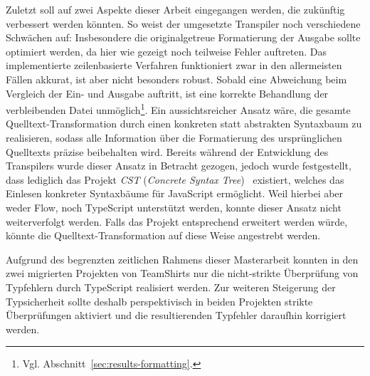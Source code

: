 Zuletzt soll auf zwei Aspekte dieser Arbeit eingegangen werden, die zukünftig verbessert werden könnten. So weist der umgesetzte Transpiler noch verschiedene Schwächen auf: Insbesondere die originalgetreue Formatierung der Ausgabe sollte optimiert werden, da hier wie gezeigt noch teilweise Fehler auftreten. Das implementierte zeilenbasierte Verfahren funktioniert zwar in den allermeisten Fällen akkurat, ist aber nicht besonders robust. Sobald eine Abweichung beim Vergleich der Ein- und Ausgabe auftritt, ist eine korrekte Behandlung der verbleibenden Datei unmöglich\footnote{Vgl. Abschnitt~\ref{sec:results-formatting}.}. Ein aussichtsreicher Ansatz wäre, die gesamte Quelltext-Transformation durch einen konkreten statt abstrakten Syntaxbaum zu realisieren, sodass alle Information über die Formatierung des ursprünglichen Quelltexts präzise beibehalten wird. Bereits während der Entwicklung des Transpilers wurde dieser Ansatz in Betracht gezogen, jedoch wurde festgestellt, dass lediglich das Projekt \textit{CST} (\textit{Concrete Syntax Tree})~\autocite{SOFTWARE:CST} existiert, welches das Einlesen konkreter Syntaxbäume für JavaScript ermöglicht. Weil hierbei aber weder Flow, noch TypeScript unterstützt werden, konnte dieser Ansatz nicht weiterverfolgt werden. Falls das Projekt entsprechend erweitert werden würde, könnte die Quelltext-Transformation auf diese Weise angestrebt werden.

Aufgrund des begrenzten zeitlichen Rahmens dieser Masterarbeit konnten in den zwei migrierten Projekten von TeamShirts nur die nicht-strikte Überprüfung von Typfehlern durch TypeScript realisiert werden. Zur weiteren Steigerung der Typsicherheit sollte deshalb perspektivisch in beiden Projekten strikte Überprüfungen aktiviert und die resultierenden Typfehler daraufhin korrigiert werden.

